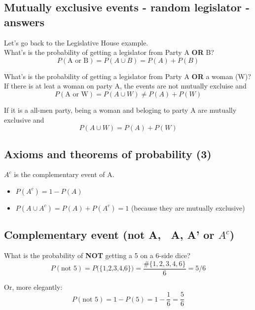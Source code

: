 \documentclass[11pt]{article}
\begin{document}
	\subsection*{Mutually exclusive events - random legislator - answers}
	
	Let's go back to the Legislative House example.\\
	
	What's is the probability of getting a legislator from Party A \textbf{OR} B?
	\[P(\text{A or B}) = P(A \cup B) = P(A) + P(B)\]
	
	What's is the probability of getting a legislator from Party A \textbf{OR} a woman (W)?\\
	
	If there is at leat a woman on party A, the events are not mutually excluise and \[P(\text{A or W}) = P(A \cup W) \neq P(A) + P(W)\]
	
	If it is a all-men party, being a woman and beloging to party A are mutually exclusive and
	\[P(A \cup W) = P(A) + P(W)\]


	\subsection*{Axioms and theorems of probability (3)}
	$A^c$ is the complementary event of A.
	\begin{itemize}
		\item  $P(A^c) = 1 - P(A)$
		\item  $P(A \cup A^c) = P(A) + P(A^c) = 1$ (because they are mutually exclusive)
	\end{itemize}


	\subsection*{Complementary event (not A, ~A, A' or $A^c$)}
	What is the probability of \textbf{NOT} getting a 5 on a 6-side dice?
	\[P(\text{not 5}) = P\text{(\{1,2,3,4,6\})} = \frac{\#\{1, 2, 3, 4, 6\}}{6} =  5/6	\]

	Or, more elegantly:
	\[P(\text{not 5}) = 1 - P(5) = 1 - \frac{1}{6} = \frac{5}{6}\]
\end{document}
